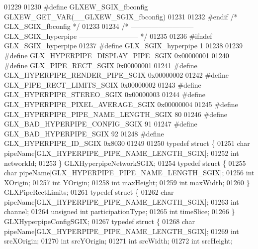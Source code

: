 \begin{DoxyCode}
01229 
01230 \textcolor{preprocessor}{#define GLXEW\_SGIX\_fbconfig GLXEW\_GET\_VAR(\_\_GLXEW\_SGIX\_fbconfig)}
01231 
01232 \textcolor{preprocessor}{#endif }\textcolor{comment}{/* GLX\_SGIX\_fbconfig */}\textcolor{preprocessor}{}
01233 
01234 \textcolor{comment}{/* --------------------------- GLX\_SGIX\_hyperpipe -------------------------- */}
01235 
01236 \textcolor{preprocessor}{#ifndef GLX\_SGIX\_hyperpipe}
01237 \textcolor{preprocessor}{#define GLX\_SGIX\_hyperpipe 1}
01238 
01239 \textcolor{preprocessor}{#define GLX\_HYPERPIPE\_DISPLAY\_PIPE\_SGIX 0x00000001}
01240 \textcolor{preprocessor}{#define GLX\_PIPE\_RECT\_SGIX 0x00000001}
01241 \textcolor{preprocessor}{#define GLX\_HYPERPIPE\_RENDER\_PIPE\_SGIX 0x00000002}
01242 \textcolor{preprocessor}{#define GLX\_PIPE\_RECT\_LIMITS\_SGIX 0x00000002}
01243 \textcolor{preprocessor}{#define GLX\_HYPERPIPE\_STEREO\_SGIX 0x00000003}
01244 \textcolor{preprocessor}{#define GLX\_HYPERPIPE\_PIXEL\_AVERAGE\_SGIX 0x00000004}
01245 \textcolor{preprocessor}{#define GLX\_HYPERPIPE\_PIPE\_NAME\_LENGTH\_SGIX 80}
01246 \textcolor{preprocessor}{#define GLX\_BAD\_HYPERPIPE\_CONFIG\_SGIX 91}
01247 \textcolor{preprocessor}{#define GLX\_BAD\_HYPERPIPE\_SGIX 92}
01248 \textcolor{preprocessor}{#define GLX\_HYPERPIPE\_ID\_SGIX 0x8030}
01249 
01250 \textcolor{keyword}{typedef} \textcolor{keyword}{struct }\{
01251   \textcolor{keywordtype}{char} pipeName[GLX_HYPERPIPE_PIPE_NAME_LENGTH_SGIX]; 
01252   \textcolor{keywordtype}{int}  networkId; 
01253 \} GLXHyperpipeNetworkSGIX;
01254 \textcolor{keyword}{typedef} \textcolor{keyword}{struct }\{
01255   \textcolor{keywordtype}{char} pipeName[GLX_HYPERPIPE_PIPE_NAME_LENGTH_SGIX]; 
01256   \textcolor{keywordtype}{int} XOrigin; 
01257   \textcolor{keywordtype}{int} YOrigin; 
01258   \textcolor{keywordtype}{int} maxHeight; 
01259   \textcolor{keywordtype}{int} maxWidth; 
01260 \} GLXPipeRectLimits;
01261 \textcolor{keyword}{typedef} \textcolor{keyword}{struct }\{
01262   \textcolor{keywordtype}{char} pipeName[GLX_HYPERPIPE_PIPE_NAME_LENGTH_SGIX]; 
01263   \textcolor{keywordtype}{int} channel; 
01264   \textcolor{keywordtype}{unsigned} \textcolor{keywordtype}{int} participationType; 
01265   \textcolor{keywordtype}{int} timeSlice; 
01266 \} GLXHyperpipeConfigSGIX;
01267 \textcolor{keyword}{typedef} \textcolor{keyword}{struct }\{
01268   \textcolor{keywordtype}{char} pipeName[GLX_HYPERPIPE_PIPE_NAME_LENGTH_SGIX]; 
01269   \textcolor{keywordtype}{int} srcXOrigin; 
01270   \textcolor{keywordtype}{int} srcYOrigin; 
01271   \textcolor{keywordtype}{int} srcWidth; 
01272   \textcolor{keywordtype}{int} srcHeight; 

\end{DoxyCode}
